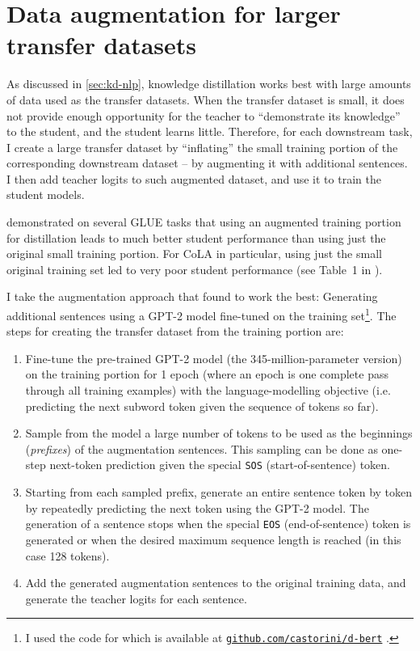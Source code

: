\documentclass[bsc,frontabs,singlespacing,parskip,deptreport]{infthesis}
\newcommand\rurl[1]{%
  \href{https://#1}{\nolinkurl{#1}}%
}
\begin{document}
{  \section{Data augmentation for larger transfer datasets}{
    \label{sec:augmentation}
    As discussed in \autoref{sec:kd-nlp}, knowledge distillation works best with large amounts of data used as the transfer datasets. When the transfer dataset is small, it does not provide enough opportunity for the teacher to ``demonstrate its knowledge'' to the student, and the student learns little. Therefore, for each downstream task, I create a large transfer dataset by ``inflating'' the small training portion of the corresponding downstream dataset -- by augmenting it with additional sentences. I then add teacher logits to such augmented dataset, and use it to train the student models.

    \citet{Tang_2019b} demonstrated on several GLUE tasks that using an augmented training portion for distillation leads to much better student performance than using just the original small training portion.
    For CoLA in particular, using just the small original training set led to very poor student performance (see Table~1 in \citeauthor{Tang_2019b}).
    
    I take the augmentation approach that \citeauthor{Tang_2019b} found to work the best: Generating additional sentences using a GPT-2 model \citep{Radford_2019} fine-tuned on the training set\footnote{I used the code for \citet{Tang_2019b} which is available at \rurl{github.com/castorini/d-bert}.}. The steps for creating the transfer dataset from the training portion are:
    \begin{enumerate}
      \item Fine-tune the pre-trained GPT-2 model (the 345-million-parameter version) on the training portion for 1 epoch (where an epoch is one complete pass through all training examples) with the language-modelling objective (i.e. predicting the next subword token given the sequence of tokens so far).
      \item Sample from the model a large number of tokens to be used as the beginnings (\textit{prefixes}) of the augmentation sentences. This sampling can be done as one-step next-token prediction given the special \verb|SOS| (start-of-sentence) token.
      \item Starting from each sampled prefix, generate an entire sentence token by token by repeatedly predicting the next token using the GPT-2 model. The generation of a sentence stops when the special \verb|EOS| (end-of-sentence) token is generated or when the desired maximum sequence length is reached (in this case 128 tokens).
      \item Add the generated augmentation sentences to the original training data, and generate the teacher logits for each sentence.
    \end{enumerate}

}}
\end{document}
